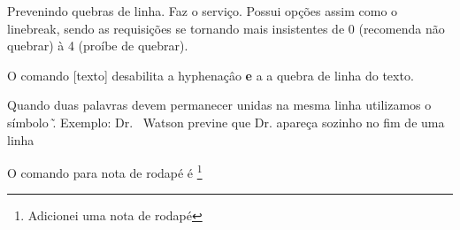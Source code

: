 \documentclass{article}
\begin{document}
Prevenindo quebras de linha.
\nolinebreak Faz o serviço.
Possui opções assim como o linebreak, sendo as requisições 
se tornando mais insistentes de 0 (recomenda não quebrar)
à 4 (proíbe de quebrar).

O comando \mbox[texto] desabilita a hyphenaçâo \textbf{e} a 
a quebra de linha do texto.

Quando duas palavras devem permanecer unidas na mesma linha utilizamos o símbolo \~.
Exemplo:
Dr. ~Watson previne que Dr. apareça sozinho no fim de uma linha

O comando para nota de rodapé é \footnote{Adicionei uma nota de rodapé}
\end{document}
